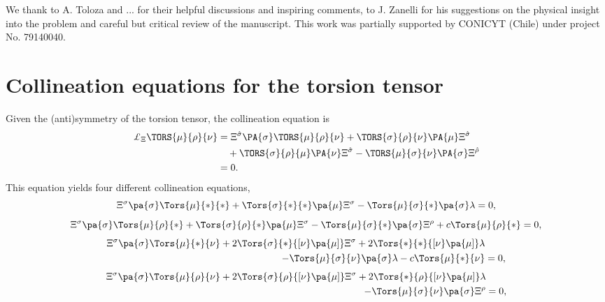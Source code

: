 \documentclass[aps,prd,12pt,superscriptaddress,showpacs,showkeys,reprint]{revtex4-1}
\begin{document}
\begin{acknowledgments}
  We thank to A. Toloza and ...  for their helpful discussions and inspiring comments, to J. Zanelli for his suggestions on the physical insight into the problem and careful but critical review of the manuscript.
  This work was partially supported by CONICYT (Chile) under project No. 79140040.
\end{acknowledgments}

\appendix

\section{Collineation equations for the torsion tensor}

Given the (anti)symmetry of the torsion tensor, the collineation equation is
\begin{equation}
  \begin{split}
    \pounds_\Xi \TORS{\mu}{\rho}{\nu} &= \Xi^{\hat{\sigma}} \PA{\sigma} \TORS{\mu}{\rho}{\nu} + \TORS{\sigma }{\rho}{\nu} \PA{\mu} \Xi^{\hat{\sigma}} \\
    & \quad + \TORS{\sigma }{\rho}{\mu} \PA{\nu} \Xi^{\hat{\sigma}}- \TORS{\mu}{\sigma}{\nu} \PA{\sigma} \Xi^{\hat{\rho}} \\
    &= 0.
  \end{split}
\end{equation}
This equation yields four different collineation equations,
\begin{equation}
    \Xi^\sigma \pa{\sigma} \Tors{\mu}{*}{*} + \Tors{\sigma}{*}{*} \pa{\mu} \Xi^\sigma - \Tors{\mu}{\sigma}{*} \pa{\sigma} \lambda = 0,
\end{equation}
\begin{equation}
  \Xi^\sigma \pa{\sigma} \Tors{\mu}{\rho}{*} + \Tors{\sigma}{\rho}{*} \pa{\mu} \Xi^\sigma - \Tors{\mu}{\sigma}{*} \pa{\sigma} \Xi^\rho + c \Tors{\mu}{\rho}{*} = 0,
\end{equation}
\begin{equation}
  \begin{split}
    \Xi^\sigma \pa{\sigma} \Tors{\mu}{*}{\nu} + 2 \Tors{\sigma}{*}{[\nu} \pa{\mu]} \Xi^\sigma + 2 \Tors{*}{*}{[\nu} \pa{\mu]} \lambda & \\
    - \Tors{\mu}{\sigma}{\nu} \pa{\sigma} \lambda - c \Tors{\mu}{*}{\nu} &= 0,
  \end{split}
\end{equation}
\begin{equation}
  \begin{split}
    \Xi^\sigma \pa{\sigma} \Tors{\mu}{\rho}{\nu} + 2 \Tors{\sigma}{\rho}{[\nu} \pa{\mu]} \Xi^\sigma + 2 \Tors{*}{\rho}{[\nu} \pa{\mu]} \lambda & \\
    - \Tors{\mu}{\sigma}{\nu} \pa{\sigma} \Xi^\rho &= 0,
  \end{split}  
\end{equation}



\end{document}
